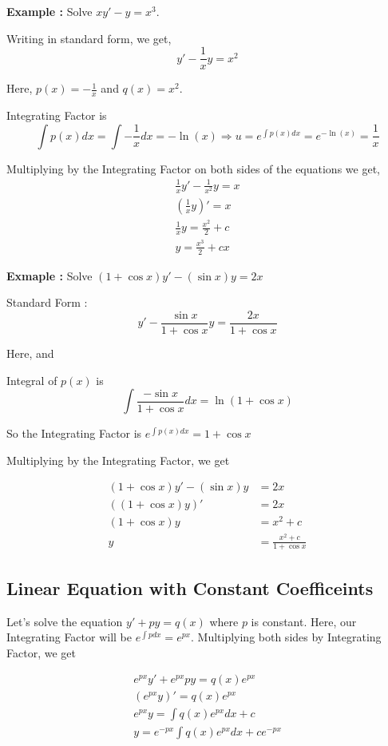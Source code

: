 {\bf Example : } Solve $xy' - y = x^3$.

Writing in standard form, we get, 
$$ y' - \frac{1}{x} y = x^2 $$

Here, $p(x) = - \frac{1}{x}$ and $q(x) = x^2$.

Integrating Factor is 
$$ \int p(x) dx = \int - \frac{1}{x} dx = - \ln(x) \Rightarrow u = e^{\int p(x) dx} = e^{-\ln(x)} = \frac{1}{x} $$ 

Multiplying by the Integrating Factor on both sides of the equations we get,
\begin{align*}
    \frac{1}{x}y' - \frac{1}{x^2}y = x \\
    \left( \frac{1}{x} y \right)' = x \\
    \frac{1}{x} y = \frac{x^2}{2} + c \\
    y = \frac{x^3}{2} + cx 
\end{align*}


{\bf Exmaple : } Solve $ (1 + \cos x) y' - (\sin x) y = 2x $

Standard Form : $$ y' - \frac{\sin x}{1 + \cos x} y = \frac{2x}{1 + \cos x} $$

Here,  and 

Integral of $p(x)$ is $$ \int \frac{ - \sin x }{1 + \cos x} dx = \ln( 1 + \cos x ) $$

So the Integrating Factor is $ e^{\int p(x) dx} = 1 + \cos x $

Multiplying by the Integrating Factor, we get 

\begin{align*}
    (1+ \cos x)y' - ( \sin x )y & = 2x \\
    ((1 + \cos x) y)' & = 2x \\
    (1 + \cos x) y & = x^2 + c \\
    y & = \frac{x^2 + c}{1 + \cos x}
\end{align*}

\subsection{Linear Equation with Constant Coefficeints}

Let's solve the equation $ y' + py = q(x) $ where $p$ is constant.
Here, our Integrating Factor will be $ e^{\int p dx} = e^{px} $.
Multiplying both sides by Integrating Factor, we get 

\begin{gather*}
e^{px}y' + e^{px} p y = q(x) e^{px} \\
(e^{px} y)' = q(x) e^{px} \\
e^{px} y = \int q(x) e^{px} dx + c \\
y = e^{-px} \int q(x) e^{px} dx + c e^{-px} 
\end{gather*}

